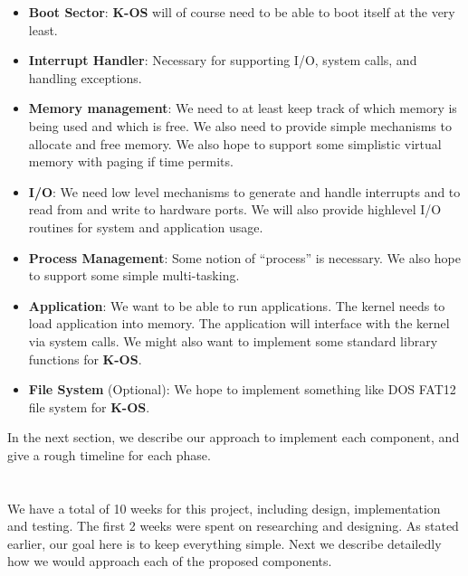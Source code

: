 \documentclass[dvips,11pt]{article}
\begin{document}
\begin{itemize}

\item {\bf Boot Sector}: {\bf K-OS} will of course need to be able to
  boot itself at the very least.
\item {\bf Interrupt Handler}: Necessary for supporting I/O, system
  calls, and handling exceptions.
\item {\bf Memory management}: We need to at least keep track of
  which memory is being used and which is free. We also need to
  provide simple mechanisms to allocate and free memory. We also hope
  to support some simplistic virtual memory with paging if time
  permits. 
\item {\bf I/O}: We need low level mechanisms to generate and handle
  interrupts and to read from and write to hardware ports. We will
  also provide highlevel I/O routines for system and application
  usage. 
\item {\bf Process Management}: Some notion of ``process'' is
  necessary. We also hope to support some simple multi-tasking. 
\item {\bf Application}: We want to be able to run applications. The
  kernel needs to load application into memory. The application will
  interface with the kernel via system calls. We might also want to
  implement some standard library functions for {\bf K-OS}.
\item {\bf File System} (Optional): We hope to implement something 
  like DOS FAT12 file system for {\bf K-OS}.

\end{itemize}

In the next section, we describe our approach to implement each
component, and give a rough timeline for each phase.



\section{\textbf{}}

We have a total of 10 weeks for this project, including design,
implementation and testing. The first 2 weeks were
spent on researching and designing. As stated earlier, our goal here
is to keep everything simple. Next we describe detailedly how we would
approach each of the proposed components.
\end{document}
